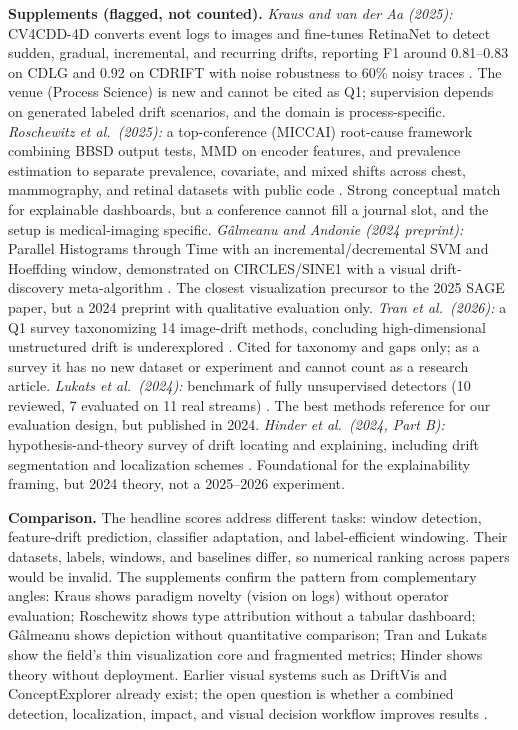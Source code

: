 \documentclass[10pt,a4paper]{article}
\begin{document}
\textbf{Supplements (flagged, not counted).} \emph{Kraus and van der Aa (2025):} CV4CDD-4D converts event logs to images and fine-tunes RetinaNet to detect sudden, gradual, incremental, and recurring drifts, reporting F1 around 0.81--0.83 on CDLG and 0.92 on CDRIFT with noise robustness to 60\% noisy traces \cite{kraus}. The venue (Process Science) is new and cannot be cited as Q1; supervision depends on generated labeled drift scenarios, and the domain is process-specific. \emph{Roschewitz et al.\ (2025):} a top-conference (MICCAI) root-cause framework combining BBSD output tests, MMD on encoder features, and prevalence estimation to separate prevalence, covariate, and mixed shifts across chest, mammography, and retinal datasets with public code \cite{roschewitz}. Strong conceptual match for explainable dashboards, but a conference cannot fill a journal slot, and the setup is medical-imaging specific. \emph{G\^almeanu and Andonie (2024 preprint):} Parallel Histograms through Time with an incremental/decremental SVM and Hoeffding window, demonstrated on CIRCLES/SINE1 with a visual drift-discovery meta-algorithm \cite{galmeanu}. The closest visualization precursor to the 2025 SAGE paper, but a 2024 preprint with qualitative evaluation only. \emph{Tran et al.\ (2026):} a Q1 survey taxonomizing 14 image-drift methods, concluding high-dimensional unstructured drift is underexplored \cite{tran}. Cited for taxonomy and gaps only; as a survey it has no new dataset or experiment and cannot count as a research article. \emph{Lukats et al.\ (2024):} benchmark of fully unsupervised detectors (10 reviewed, 7 evaluated on 11 real streams) \cite{lukats}. The best methods reference for our evaluation design, but published in 2024. \emph{Hinder et al.\ (2024, Part B):} hypothesis-and-theory survey of drift locating and explaining, including drift segmentation and localization schemes \cite{hinderB}. Foundational for the explainability framing, but 2024 theory, not a 2025--2026 experiment.

\textbf{Comparison.} The headline scores address different tasks: window detection, feature-drift prediction, classifier adaptation, and label-efficient windowing. Their datasets, labels, windows, and baselines differ, so numerical ranking across papers would be invalid. The supplements confirm the pattern from complementary angles: Kraus shows paradigm novelty (vision on logs) without operator evaluation; Roschewitz shows type attribution without a tabular dashboard; G\^almeanu shows depiction without quantitative comparison; Tran and Lukats show the field's thin visualization core and fragmented metrics; Hinder shows theory without deployment. Earlier visual systems such as DriftVis and ConceptExplorer already exist; the open question is whether a combined detection, localization, impact, and visual decision workflow improves results \cite{driftvis,conceptexplorer}.
\end{document}
